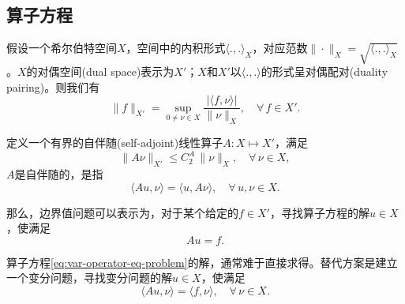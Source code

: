 \subsection{算子方程}
\label{sec:variational-operator-equations}

假设一个希尔伯特空间$X$，空间中的内积形式$\langle .,.\rangle_{X}$，对应范数$\| \cdot \|_{X} = \sqrt{\langle .,.\rangle_{X}}$。$X$的对偶空间(dual space)表示为$X'$；$X$和$X'$以$\langle .,. \rangle$的形式呈对偶配对(duality pairing)。则我们有
\begin{equation}
  \label{eq:var-operator-norm}
  \big\| f \big\|_{X'} = \sup_{0 \neq \nu \in X}
  \frac{
  \big| \langle f,\nu \rangle \big|
  }{\| \nu \|_{X}}, \quad \forall \, f \in X'.
\end{equation}

定义一个有界的自伴随(self-adjoint)线性算子$A:X \mapsto X'$，满足
\begin{equation}
  \label{eq:var-operator-equation}
  \big\| A \nu \big\|_{X'} \le C_2^A \, \| \nu \|_{X}, \quad \forall \, \nu \in X,
\end{equation}
$A$是自伴随的，是指
\begin{equation}
  \label{eq:var-operator-self-adjoint}
  \langle A u, \nu \rangle = \langle  u, A \nu \rangle, \quad \forall \, u, \nu \in X.
\end{equation}

那么，边界值问题可以表示为，对于某个给定的$f \in X'$，寻找算子方程的解$u \in X$，使满足
\begin{equation}
  \label{eq:var-operator-eq-problem}
  A u = f.
\end{equation}

算子方程\eqref{eq:var-operator-eq-problem}的解，通常难于直接求得。替代方案是建立一个变分问题，寻找变分问题的解$u \in X$，使满足
\begin{equation}
  \label{eq:var-operator-var-problem}
  \langle Au,\nu \rangle = \langle f, \nu \rangle, \quad \forall \, \nu \in X.
\end{equation}

